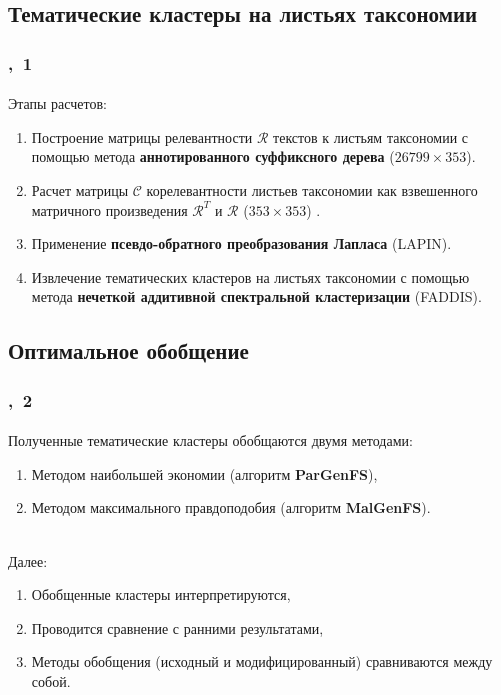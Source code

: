 \documentclass[aspectratio=169]{beamer}
\begin{document}
\subsection{Тематические кластеры на листьях таксономии}
	
	
\begin{frame}
	\frametitle{\insertsection,~1}
	\framesubtitle{\large \insertsubsection}
	Этапы расчетов:
	\begin{enumerate}
		\item Построение матрицы релевантности $\mathcal{R}$ текстов к листьям таксономии с помощью метода \textbf{аннотированного суффиксного дерева} ($26799\times353$). 
		\item Расчет матрицы $\mathcal{C}$ корелевантности листьев таксономии как взвешенного матричного произведения $\mathcal{R}^T$ и $\mathcal{R}$ ($353\times353$) . 
		\item Применение \textbf{псевдо-обратного преобразования Лапласа} (LAPIN).
		\item Извлечение тематических кластеров на листьях таксономии с помощью метода \textbf{нечеткой аддитивной спектральной кластеризации} (FADDIS).
	\end{enumerate}
\end{frame}


\subsection{Оптимальное обобщение}


\begin{frame}
\frametitle{\insertsection,~2}
\framesubtitle{\large \insertsubsection}

Полученные тематические кластеры обобщаются двумя методами:
\begin{enumerate}
	\item Методом наибольшей экономии (алгоритм \textbf{ParGenFS}),
	\item Методом максимального правдоподобия (алгоритм \textbf{MalGenFS}).
\end{enumerate}
~\\

Далее:
\begin{enumerate}
	\item Обобщенные кластеры интерпретируются,
	\item Проводится сравнение с ранними результатами,
	\item Методы обобщения (исходный и модифицированный) сравниваются между собой.
\end{enumerate}


\end{frame}
\end{document}
